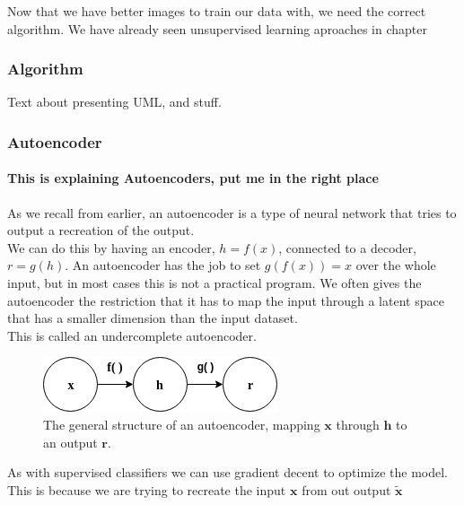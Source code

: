     Now that we have better images to train our data with, we need the correct algorithm.
    We have already seen unsupervised learning aproaches in chapter %
    \newpage
    \subsubsection{Algorithm}
      Text about presenting UML, and stuff.
      \subsubsection{Autoencoder}
	\paragraph{This is explaining Autoencoders, put me in the right place} %
	  As we recall from earlier, an autoencoder is a type of neural network that tries to output a recreation of the output. \\ 
	  We can do this by having an encoder, $h=f(x)$, connected to a decoder, $r=g(h)$. 
	  An autoencoder has the job to set $g(f(x))=x$ over the whole input, but in most cases this is not a practical program. We often gives the autoencoder the restriction
	  that it has to map the input through a latent space that has a smaller dimension than the input dataset.\\
	  This is called an undercomplete autoencoder.\\
	  \vspace{10px}
	  \begin{figure}[ht!]
	    \centering
	    \includegraphics[scale=0.5]{background/figures/SimpleAE.png}
	    \caption{The general structure of an autoencoder, mapping $\textbf{x}$ through $\textbf{h}$ to an output $\textbf{r}$.}
	  \end{figure}
	  
	  As with supervised classifiers we can use gradient decent to optimize the model. This is because we are trying to recreate the input $\textbf{x}$ from out output $\widetilde{\textbf{x}}$\\
	  
